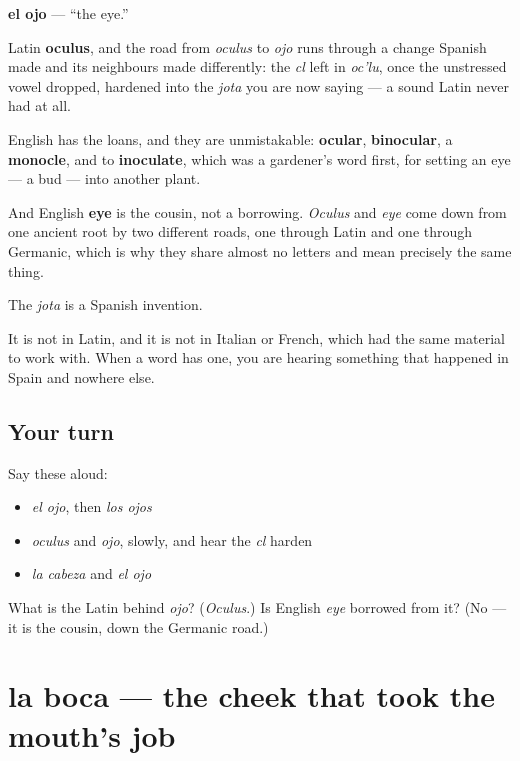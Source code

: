 \begin{cousinweb}
\textbf{el ojo} — \textquotedblleft{}the eye.\textquotedblright{}

Latin \textbf{oculus}, and the road from \emph{oculus} to \emph{ojo} runs through a change Spanish made and its neighbours made differently: the \emph{cl} left in \emph{oc'lu}, once the unstressed vowel dropped, hardened into the \emph{jota} you are now saying — a sound Latin never had at all.

English has the loans, and they are unmistakable: \textbf{ocular}, \textbf{binocular}, a \textbf{monocle}, and to \textbf{inoculate}, which was a gardener's word first, for setting an eye — a bud — into another plant.

And English \textbf{eye} is the cousin, not a borrowing. \emph{Oculus} and \emph{eye} come down from one ancient root by two different roads, one through Latin and one through Germanic, which is why they share almost no letters and mean precisely the same thing.
\end{cousinweb}

\begin{grammarlens}[title={What you've built}]
The \emph{jota} is a Spanish invention.

It is not in Latin, and it is not in Italian or French, which had the same material to work with. When a word has one, you are hearing something that happened in Spain and nowhere else.
\end{grammarlens}

\subsection*{Your turn}
Say these aloud:

\begin{itemize}
\raggedright
  \item \emph{el ojo}, then \emph{los ojos}
  \item \emph{oculus} and \emph{ojo}, slowly, and hear the \emph{cl} harden
  \item \emph{la cabeza} and \emph{el ojo}
\end{itemize}

\begin{tcolorbox}[breakable,colback=teal!4,colframe=teal!35!black,title={Before you move on}]
What is the Latin behind \emph{ojo}? (\emph{Oculus}.) Is English \emph{eye} borrowed from it? (No — it is the cousin, down the Germanic road.)
\end{tcolorbox}
\section[la boca]{la boca — the cheek that took the mouth's job}

